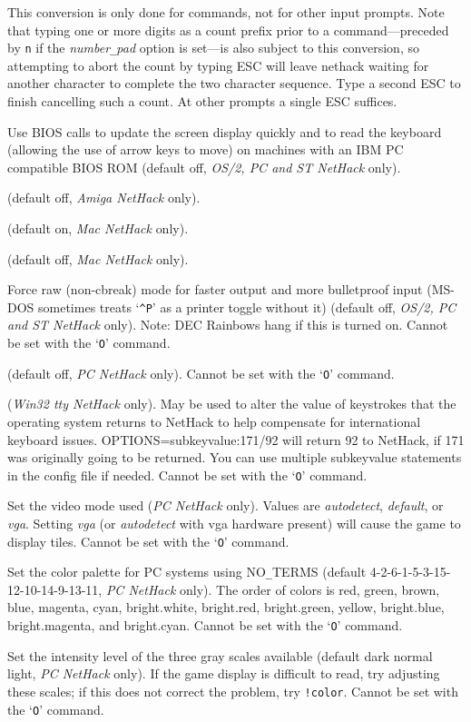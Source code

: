 This conversion is only done for commands, not for other input prompts.
Note that typing one or more digits as a count prefix prior to a
command---preceded by {\tt n} if the {\it number\verb+_+pad\/}
option is set---is also subject to this conversion, so attempting to
abort the count by typing ESC will leave nethack waiting for another
character to complete the two character sequence.  Type a second ESC to
finish cancelling such a count.  At other prompts a single ESC suffices.
\item[\ib{BIOS}]
Use BIOS calls to update the screen display quickly and to read the keyboard
(allowing the use of arrow keys to move) on machines with an IBM PC
compatible BIOS ROM (default off, {\it OS/2, PC\/ {\rm and} ST NetHack\/} only).
\item[\ib{flush}]
(default off, {\it Amiga NetHack \/} only).
\item[\ib{Macgraphics}]
(default on, {\it Mac NetHack \/} only).
\item[\ib{page\verb+_+wait}]
(default off, {\it Mac NetHack \/} only).
\item[\ib{rawio}]
Force raw (non-cbreak) mode for faster output and more
bulletproof input (MS-DOS sometimes treats `{\tt \^{}P}' as a printer toggle
without it) (default off, {\it OS/2, PC\/ {\rm and} ST NetHack\/} only).  
Note:  DEC Rainbows hang if this is turned on.
Cannot be set with the `{\tt O}' command.
\item[\ib{soundcard}]
(default off, {\it PC NetHack \/} only).
Cannot be set with the `{\tt O}' command.
\item[\ib{subkeyvalue}]
({\it Win32 tty NetHack \/} only).
May be used to alter the value of keystrokes that the operating system
returns to NetHack to help compensate for international keyboard issues.
OPTIONS=subkeyvalue:171/92
will return 92 to NetHack, if 171 was originally going to be returned.
You can use multiple subkeyvalue statements in the config file if needed.
Cannot be set with the `{\tt O}' command.
\item[\ib{video}]
Set the video mode used ({\it PC\/ NetHack\/} only).
Values are {\it autodetect\/}, {\it default\/}, or {\it vga\/}. 
Setting {\it vga\/} (or {\it autodetect\/} with vga hardware present) will cause
the game to display tiles. 
Cannot be set with the `{\tt O}' command.
\item[\ib{videocolors}]
\begin{sloppypar}
Set the color palette for PC systems using NO\verb+_+TERMS
(default 4-2-6-1-5-3-15-12-10-14-9-13-11, {\it PC\/ NetHack\/} only).
The order of colors is red, green, brown, blue, magenta, cyan,
bright.white, bright.red, bright.green, yellow, bright.blue,
bright.magenta, and bright.cyan.
Cannot be set with the `{\tt O}' command.
\end{sloppypar}
\item[\ib{videoshades}]
Set the intensity level of the three gray scales available
(default dark normal light, {\it PC\/ NetHack\/} only).
If the game display is difficult to read, try adjusting these scales;
if this does not correct the problem, try {\tt !color}.
Cannot be set with the `{\tt O}' command.
\elist

